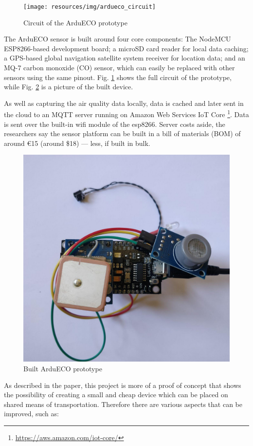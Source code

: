 		\begin{figure}[H]
			\centering
			\texttt{[image: resources/img/ardueco\_circuit]}
			\caption{Circuit of the ArduECO prototype}
			\label{img:ardueco_circuit}
		\end{figure}
		
		The ArduECO sensor is built around four core components: The NodeMCU ESP8266-based development board; a microSD card reader for local data caching; a GPS-based global navigation satellite system receiver for location data; and an MQ-7 carbon monoxide (CO) sensor, which can easily be replaced with other sensors using the same pinout.
		Fig. \ref{img:ardueco_circuit} shows the full circuit of the prototype, while Fig. \ref{img:ardueco_picture} is a picture of the built device.
		
		As well as capturing the air quality data locally, data is cached and later sent in the cloud to an MQTT server running on Amazon Web Services IoT Core \footnote{\url{https://aws.amazon.com/iot-core/}}.
		Data is sent over the built-in wifi module of the esp8266.
		Server costs aside, the researchers say the sensor platform can be built in a bill of materials (BOM) of around €15 (around \$18) — less, if built in bulk.
		
		\begin{figure}[H]
			\centering
			\includegraphics[width=.5\textwidth]{resources/img/ardueco_picture}
			\caption{Built ArduECO prototype}
			\label{img:ardueco_picture}
		\end{figure}
	
		As described in the paper, this project is more of a proof of concept that shows the possibility of creating a small and cheap device which can be placed on shared means of transportation.
		Therefore there are various aspects that can be improved, such as:


